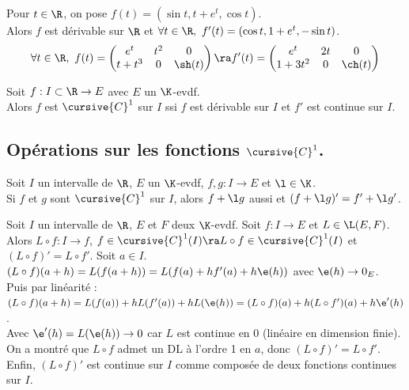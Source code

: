 \documentclass[11pt]{article}
\begin{document}
\vspace*{-0.7cm}

\begin{ex}{}{}
    Pour $t\in\R$, on pose $f(t)=(\sin t, t + e^t, \cos t)$.\\
    Alors $f$ est dérivable sur $\R$ et $\forall t \in \R, ~ f'(t)=(\cos t, 1 + e^t, -\sin t)$.
    \begin{equation*}
        \forall t \in \R, ~ f(t) = \begin{pmatrix}e^t & t^2 & 0 \\ t+t^3 & 0 & \sh(t)\end{pmatrix} \ra f'(t) = \begin{pmatrix}e^t & 2t & 0 \\ 1+3t^2 & 0 & \ch(t)\end{pmatrix}
    \end{equation*}
\end{ex}

\begin{defi}{}{}
    Soit $f:I\subset\R\to E$ avec $E$ un $\K$-evdf.\\
    Alors $f$ est $\cursive{C}^1$ sur $I$ ssi $f$ est dérivable sur $I$ et $f'$ est continue sur $I$.
\end{defi}

\subsection{Opérations sur les fonctions \texorpdfstring{$\cursive{C}^1$}{Lg}.}

\begin{prop}{}{}
    Soit $I$ un intervalle de $\R$, $E$ un $\K$-evdf, $f,g:I\to E$ et $\l\in\K$.\\
    Si $f$ et $g$ sont $\cursive{C}^1$ sur $I$, alors $f+\l g$ aussi et $(f+\l g)' = f' + \l g'$.
\end{prop}

\vspace*{-0.7cm}

\begin{prop}{}{}
    Soit $I$ un intervalle de $\R$, $E$ et $F$ deux $\K$-evdf. Soit $f:I\to E$ et $L\in\L(E,F)$.\\
    Alors $L\circ f : I \to f$, $f\in\cursive{C}^1(I)\ra L\circ f \in \cursive{C}^1(I)$ et $(L \circ f)' = L\circ f'$.
    \tcblower
    Soit $a\in I$. $(L\circ f)(a+h)=L(f(a+h))=L(f(a)+hf'(a)+h\e(h))$ avec $\e(h)\to 0_E$.\\
    Puis par linéarité : $(L\circ f)(a+h)=L(f(a))+hL(f'(a))+hL(\e(h))=(L\circ f)(a)+h(L\circ f')(a)+h\e'(h)$.\\
    Avec $\e'(h)=L(\e(h))\to 0$ car $L$ est continue en 0 (linéaire en dimension finie).\\
    On a montré que $L\circ f$ admet un DL à l'ordre 1 en $a$, donc $(L\circ f)'=L\circ f'$.\\
    Enfin, $(L\circ f)'$ est continue sur $I$ comme composée de deux fonctions continues sur $I$.
\end{prop}
\end{document}
